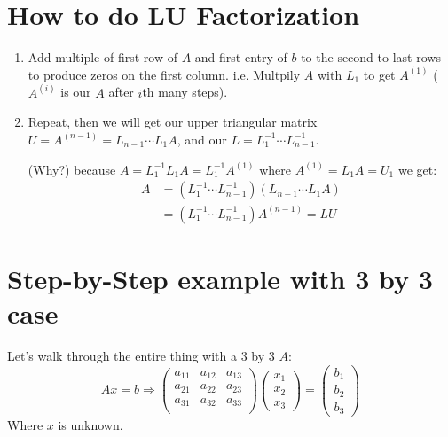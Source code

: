 \section{How to do LU Factorization}
\label{sec:hwo}
\begin{enumerate}
\item Add multiple of first row of $A$ and first entry of $b$ to the
  second to last rows to produce zeros on the first
  column. i.e. Multpily $A$ with $L_1$ to get $A^{(1)}$ ($A^{(i)}$ is
  our $A$ after $i$th many steps).
\item Repeat, then we will get our upper triangular matrix 
  $U=A^{(n-1)}=L_{n-1}\cdots L_1A$, and our $L=L_{1}^{-1}\cdots
  L_{n-1}^{-1}$.

(Why?) because $A=L_1^{-1}L_1A=L_1^{-1}A^{(1)}$ where
$A^{(1)}=L_1A=U_1$ we get: 
  \begin{align*}
A&= (L_{1}^{-1}\cdots L_{n-1}^{-1})(L_{n-1}\cdots L_1A) \\
&=(L_{1}^{-1}\cdots L_{n-1}^{-1})A^{(n-1)}= LU    
  \end{align*}
\end{enumerate}

\section{Step-by-Step example with 3 by 3 case}
\label{sec:example}
Let's walk through the entire thing with a 3 by 3 $A$:
$$Ax=b \Rightarrow
\begin{pmatrix}
  a_{11}&  a_{12}&  a_{13}\\
  a_{21}&  a_{22}&  a_{23}\\ 
 a_{31}&  a_{32}&  a_{33}\\
\end{pmatrix}
\begin{pmatrix}
  x_1\\ x_2 \\ x_3
\end{pmatrix}
=
\begin{pmatrix}
  b_1\\ b_2 \\ b_3
\end{pmatrix}
$$
Where $x$ is unknown. %

